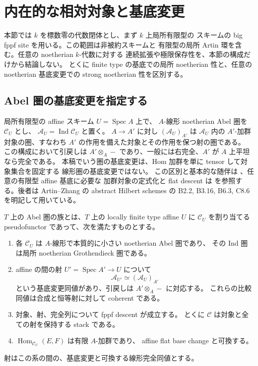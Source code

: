 \section{内在的な相対対象と基底変更}
\label{sec:moduli-relative}

本節では $k$ を標数零の代数閉体とし、まず $k$ 上局所有限型の
スキームの big fppf site を用いる。この範囲は非被約スキームと
有限型の局所 Artin 環を含む。任意の noetherian $k$-代数に対する
連続拡張や極限保存性を、本節の構成だけから結論しない。
とくに finite type の基底での局所 noetherian 性と、任意の
noetherian 基底変更での strong noetherian 性を区別する。

\subsection{Abel 圏の基底変更を指定する}

局所有限型の affine スキーム $U=\operatorname{Spec}A$ 上で、
$A$-線形 noetherian Abel 圏を $\mathcal C_U$ とし、
$\mathcal A_U=\operatorname{Ind}\mathcal C_U$ と置く。
$A\to A'$ に対し $(\mathcal A_U)_{A'}$ は
$\mathcal A_U$ 内の $A'$-加群対象の圏、すなわち
$A'$ の作用を備えた対象とその作用を保つ射の圏である。
この構成において引戻しは
$A'\otimes_A-$ であり、一般には右完全、$A'$ が $A$ 上平坦なら完全である。
本稿でいう圏の基底変更は、Hom 加群を単に tensor して対象集合を固定する
線形圏の基底変更ではない。
この区別と基本的な随伴は
\cite[\S4]{LowenVanDenBergh2006}、任意の有限型 affine 基底に必要な
加群対象の定式化と flat descent は
\cite[\S7.1, Definition 7.3, Remarks 7.4--7.5]{AHLHExistence}
を参照する。後者は Artin--Zhang の abstract Hilbert schemes の
B2.2, B3.16, B6.3, C8.6 を明記して用いている。

\begin{definition}
\label{def:relative-abelian-system}
$T$ 上の Abel 圏の族とは、$T$ 上の locally finite type affine
$U$ に $\mathcal C_U$ を割り当てる pseudofunctor であって、次を満たすものとする。
\begin{enumerate}
\item 各 $\mathcal C_U$ は $A$-線形で本質的に小さい noetherian Abel 圏であり、
  その Ind 圏は局所 noetherian Grothendieck 圏である。
\item affine の間の射 $U'=\operatorname{Spec}A'\to U$ について
  \[
    \mathcal A_{U'}\simeq(\mathcal A_U)_{A'}
  \]
  という基底変更同値があり、引戻しは $A'\otimes_A-$ に対応する。
  これらの比較同値は合成と恒等射に対して coherent である。
\item 対象、射、完全列について fppf descent が成立する。
  とくに $\mathcal C$ は対象と全ての射を保持する stack である。
\item $\operatorname{Hom}_{\mathcal C_U}(E,F)$ は有限 $A$-加群であり、
  affine flat base change と可換する。
\end{enumerate}
射はこの系の間の、基底変更と可換する線形完全同値とする。
\end{definition}

